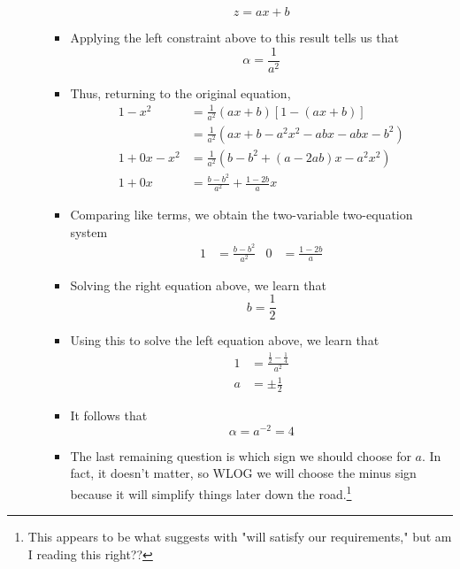 \documentclass[../finalProject.tex]{subfiles}
\begin{document}
\begin{itemize}
\begin{itemize}
\begin{itemize}
\begin{equation*}
                z = ax+b
            \end{equation*}
            \item Applying the left constraint above to this result tells us that
            \begin{equation*}
                \alpha = \frac{1}{a^2}
            \end{equation*}
            \item Thus, returning to the original equation,
            \begin{align*}
                1-x^2 &= \frac{1}{a^2}(ax+b)[1-(ax+b)]\\
                &= \frac{1}{a^2}(ax+b-a^2x^2-abx-abx-b^2)\\
                1+0x-x^2 &= \frac{1}{a^2}(b-b^2+(a-2ab)x-a^2x^2)\\
                1+0x &= \frac{b-b^2}{a^2}+\frac{1-2b}{a}x
            \end{align*}
            \item Comparing like terms, we obtain the two-variable two-equation system
            \begin{align*}
                1 &= \frac{b-b^2}{a^2}&
                0 &= \frac{1-2b}{a}
            \end{align*}
            \item Solving the right equation above, we learn that
            \begin{equation*}
                b = \frac{1}{2}
            \end{equation*}
            \item Using this to solve the left equation above, we learn that
            \begin{align*}
                1 &= \frac{\frac{1}{2}-\frac{1}{4}}{a^2}\\
                a &= \pm\frac{1}{2}
            \end{align*}
            \item It follows that
            \begin{equation*}
                \alpha = a^{-2} = 4
            \end{equation*}
            \item The last remaining question is which sign we should choose for $a$. In fact, it doesn't matter, so WLOG we will choose the minus sign because it will simplify things later down the road.\footnote{This appears to be what \textcite[73]{bib:Seaborn} suggests with "will satisfy our requirements," but am I reading this right??}

\end{itemize}
\end{itemize}
\end{itemize}
\end{document}
